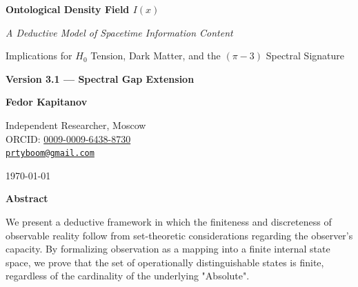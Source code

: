\documentclass[12pt, a4paper]{article}
\begin{document}

\begin{titlepage}
\centering
\vspace*{1cm}

{\Huge\bfseries Ontological Density Field $I(x)$}

\vspace{0.6cm}

{\Large\itshape A Deductive Model of Spacetime Information Content}

\vspace{0.4cm}

{\large Implications for $H_0$ Tension, Dark Matter, and the $(\pi-3)$ Spectral Signature}

\vspace{0.3cm}

{\large\bfseries Version 3.1 — Spectral Gap Extension}

\vspace{1.5cm}

{\Large\bfseries Fedor Kapitanov}

\vspace{0.5cm}

{\large Independent Researcher, Moscow}\\[0.3cm]
{\large ORCID: \href{https://orcid.org/0009-0009-6438-8730}{0009-0009-6438-8730}}\\[0.3cm]
{\large \href{mailto:prtyboom@gmail.com}{\texttt{prtyboom@gmail.com}}}

\vspace{1.5cm}

{\large \today}

\vspace{1cm}

\begin{tcolorbox}[colback=blue!5!white, colframe=blue!75!black, width=0.95\textwidth]
\textbf{Abstract}

\vspace{0.2cm}

We present a deductive framework in which the finiteness and discreteness of observable reality follow from set-theoretic considerations regarding the observer's capacity. By formalizing observation as a mapping into a finite internal state space, we prove that the set of operationally distinguishable states is finite, regardless of the cardinality of the underlying "Absolute".


\end{tcolorbox}
\end{titlepage}
\end{document}
